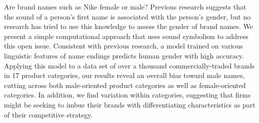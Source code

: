 Are brand names such as Nike female or male? Previous research suggests that the sound of a person's first name is associated with the person's gender, but no research has tried to use this knowledge to assess the gender of brand names. We present a simple computational approach that uses sound symbolism to address this open issue. Consistent with previous research, a model trained on various linguistic features of name endings predicts human gender with high accuracy. Applying this model to a data set of over a thousand commercially-traded brands in 17 product categories, our results reveal an overall bias toward male names, cutting across both male-oriented product categories as well as female-oriented categories. In addition, we find variation within categories, suggesting that firms might be seeking to imbue their brands with differentiating characteristics as part of their competitive strategy.
